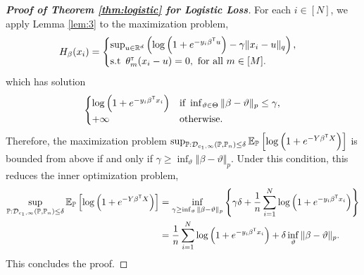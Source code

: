 \documentclass[12pt]{article}
\begin{document}
\begin{proof}[\textbf{Proof of Theorem \ref{thm:logistic} for Logistic Loss}]
    
    For each $i\in[N]$, we apply Lemma \ref{lem:3} to the maximization problem, \[
    H_\beta(x_i)=\begin{cases}
         \sup_{u\in\mathbb{R}^d}\left(\log{\left(1+e^{-y_i\beta^{\scriptscriptstyle \sf T}u} \right)}-\gamma \Vert x_i-u\Vert_q\right), &\\
        \text{s.t }\,\theta_m^{\scriptscriptstyle \sf T} (x_i-u) = 0, \text{ for all }m\in [M].
    \end{cases}
    \]
    which has solution \[
    \begin{cases}
   \log{\left(1+e^{-y_i\beta^{\scriptscriptstyle \sf T}x_i} \right)} &\text{if }\inf_{\vartheta\in\Theta} \Vert \beta -\vartheta \Vert_p \leq \gamma,\\
   +\infty & \text{otherwise.}
\end{cases}
    \]
    Therefore, the maximization problem $ \sup_{\mathbb{P}:\mathcal{D}_{c_1,\infty}(\mathbb{P},\mathbb{P}_n)\leq \delta} \mathbb{E}_{\mathbb{P}}\left[\log{\left(1+e^{-Y\beta^{\scriptscriptstyle \sf T}X}\right)}\right]$ is bounded from above if and only if $\gamma \geq \inf_{\vartheta} \Vert \beta-\vartheta\Vert_p$. Under this condition, this reduces the inner optimization problem, \begin{align*}
    \sup_{\mathbb{P}:\mathcal{D}_{c_1,\infty}(\mathbb{P},\mathbb{P}_n)\leq \delta} \mathbb{E}_{\mathbb{P}}\left[\log{\left(1+e^{-Y\beta^{\scriptscriptstyle \sf T}X}\right)}\right] &= \inf_{\gamma\geq \inf_{\vartheta} \Vert \beta-\vartheta\Vert_p}\left\{\gamma\delta + \dfrac{1}{n}\sum_{i=1}^N \log{\left(1+e^{-y_i\beta^{\scriptscriptstyle \sf T}x_i} \right)} \right\} \\
    &=\dfrac{1}{n}\sum_{i=1}^N \log{\left(1+e^{-y_i\beta^{\scriptscriptstyle \sf T}x_i} \right)} + \delta \inf_{\vartheta} \Vert \beta-\vartheta\Vert_p.
\end{align*}
This concludes the proof.
\end{proof}
\end{document}
